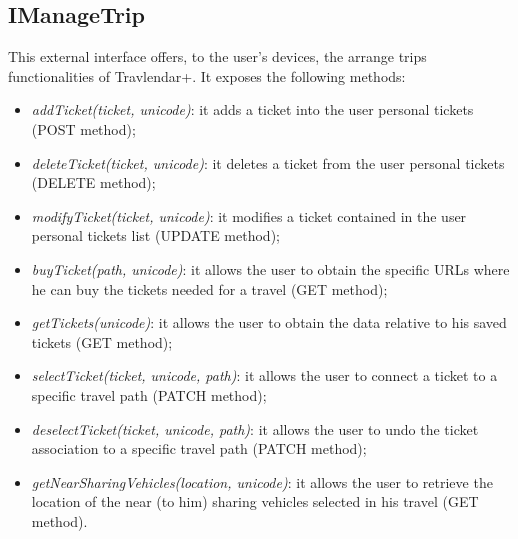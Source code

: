 \subsection{IManageTrip}
\label{subsect:IManageTrip}
This external interface offers, to the user's devices, the arrange trips functionalities of Travlendar+. It exposes the following methods:
\begin{itemize}
	\item \textit{addTicket(ticket, unicode)}: it adds a ticket into the user personal tickets (POST method);
	\item \textit{deleteTicket(ticket, unicode)}: it deletes a ticket from the user personal tickets (DELETE method);
	\item \textit{modifyTicket(ticket, unicode)}: it modifies a ticket contained in the user personal tickets list (UPDATE method);
	\item \textit{buyTicket(path, unicode)}: it allows the user to obtain the specific URLs where he can buy the tickets needed for a travel (GET method);
	\item \textit{getTickets(unicode)}: it allows the user to obtain the data relative to his saved tickets (GET method);
	\item \textit{selectTicket(ticket, unicode, path)}: it allows the user to connect a ticket to a specific travel path (PATCH method);
	\item \textit{deselectTicket(ticket, unicode, path)}: it allows the user to undo the ticket association to a specific travel path (PATCH method);
	\item \textit{getNearSharingVehicles(location, unicode)}: it allows the user to retrieve the location of the near (to him) sharing vehicles selected in his travel (GET method).
\end{itemize}

